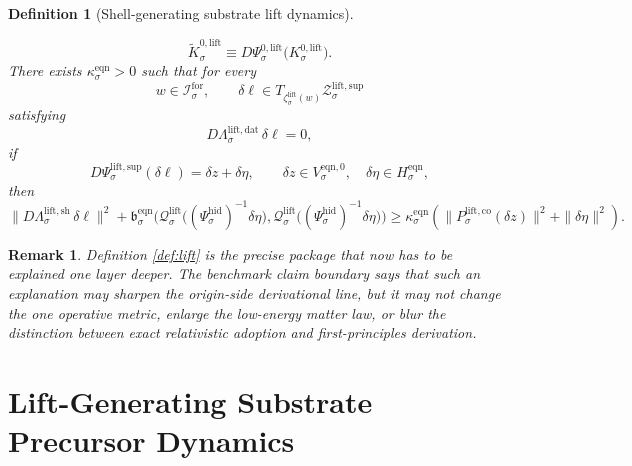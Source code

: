 \documentclass[11pt]{article}
\newcommand{\ForSpace}[1]{\mathcal I_{#1}^{\mathrm{for}}}
\newcommand{\EqnPair}[1]{\mathfrak b_{#1}^{\mathrm{eqn}}}
\newcommand{\EqnHidden}[1]{H_{#1}^{\mathrm{eqn}}}
\newcommand{\EqnZero}[1]{V_{#1}^{\mathrm{eqn},0}}
\newcommand{\HiddenChart}[1]{\Psi_{#1}^{\mathrm{hid}}}
\newcommand{\LiftData}[1]{\Lambda_{#1}^{\mathrm{lift,dat}}}
\newcommand{\LiftShellMap}[1]{\Lambda_{#1}^{\mathrm{lift,sh}}}
\newcommand{\LiftSupportShell}[1]{\mathcal Z_{#1}^{\mathrm{lift,sup}}}
\newcommand{\LiftEqChart}[1]{\Psi_{#1}^{\mathrm{lift,sup}}}
\newcommand{\LiftZeroChart}[1]{\Psi_{#1}^{0,\mathrm{lift}}}
\newcommand{\LiftCharge}[1]{\mathcal Q_{#1}^{\mathrm{lift}}}
\newcommand{\LiftEmbed}[1]{\zeta_{#1}^{\mathrm{lift}}}
\newcommand{\LiftKernel}[1]{K_{#1}^{0,\mathrm{lift}}}
\newcommand{\LiftKernelCh}[1]{\widetilde K_{#1}^{0,\mathrm{lift}}}
\newcommand{\LiftStateComp}[1]{P_{#1}^{\mathrm{lift,co}}}
\newtheorem{definition}{Definition}
\newtheorem{remark}{Remark}
\begin{document}
\begin{definition}[Shell-generating substrate lift dynamics]
\begin{enumerate}
\[    \LiftKernelCh{\sigma}
    \equiv
    D\LiftZeroChart{\sigma}\bigl(\LiftKernel{\sigma}\bigr).
    \]
    There exists \(\kappa_{\sigma}^{\mathrm{eqn}}>0\) such that for every
    \[
    w\in\ForSpace{\sigma},
    \qquad
    \delta \ell\in T_{\LiftEmbed{\sigma}(w)}\LiftSupportShell{\sigma}
    \]
    satisfying
    \[
    D\LiftData{\sigma}\,\delta \ell=0,
    \]
    if
    \[
    D\LiftEqChart{\sigma}(\delta \ell)=\delta z+\delta\eta,
    \qquad
    \delta z\in\EqnZero{\sigma},
    \quad
    \delta\eta\in\EqnHidden{\sigma},
    \]
    then
    \begin{equation}
    \|D\LiftShellMap{\sigma}\,\delta \ell\|^{2}
    +
    \EqnPair{\sigma}\bigl(
    \LiftCharge{\sigma}\bigl((\HiddenChart{\sigma})^{-1}\delta\eta\bigr),
    \LiftCharge{\sigma}\bigl((\HiddenChart{\sigma})^{-1}\delta\eta\bigr)
    \bigr)
    \ge
    \kappa_{\sigma}^{\mathrm{eqn}}
    \left(
    \|\LiftStateComp{\sigma}(\delta z)\|^{2}
    +
    \|\delta\eta\|^{2}
    \right).
    \label{eq:liftcoercive}
    \end{equation}
\end{enumerate}
\end{definition}

\begin{remark}
Definition \ref{def:lift} is the precise package that now has to be explained one layer deeper. The benchmark claim boundary says that such an explanation may sharpen the origin-side derivational line, but it may not change the one operative metric, enlarge the low-energy matter law, or blur the distinction between exact relativistic adoption and first-principles derivation.
\end{remark}

\section{Lift-Generating Substrate Precursor Dynamics}
\end{document}
